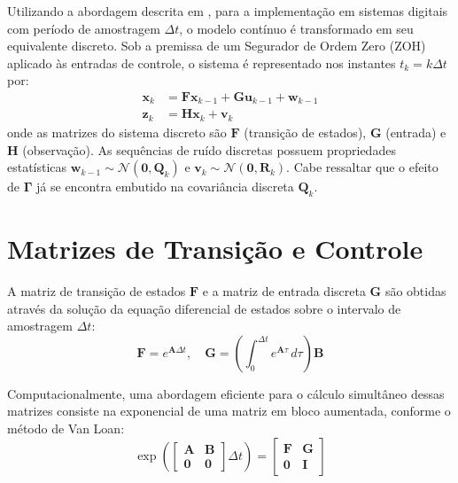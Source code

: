 \documentclass[journal]{IEEEtran}
\begin{document}
\begin{appendices}
Utilizando a abordagem descrita em \cite{chen2023kalman}, para a implementação em sistemas digitais com período de amostragem $\Delta t$, o modelo contínuo é transformado em seu equivalente discreto. Sob a premissa de um Segurador de Ordem Zero (ZOH) aplicado às entradas de controle, o sistema é representado nos instantes $t_k = k \Delta t$ por:
\begin{align}
\mathbf{x}_k &= \mathbf{F} \mathbf{x}_{k-1} + \mathbf{G} \mathbf{u}_{k-1} + \mathbf{w}_{k-1} \label{eq:ss_disc} \\
\mathbf{z}_k &= \mathbf{H} \mathbf{x}_k + \mathbf{v}_k
\end{align}
onde as matrizes do sistema discreto são $\mathbf{F}$ (transição de estados), $\mathbf{G}$ (entrada) e $\mathbf{H}$ (observação). As sequências de ruído discretas possuem propriedades estatísticas $\mathbf{w}_{k-1} \sim \mathcal{N}(\mathbf{0}, \mathbf{Q}_k)$ e $\mathbf{v}_k \sim \mathcal{N}(\mathbf{0}, \mathbf{R}_k)$. Cabe ressaltar que o efeito de $\mathbf{\Gamma}$ já se encontra embutido na covariância discreta $\mathbf{Q}_k$.

\section{Matrizes de Transição e Controle}

A matriz de transição de estados $\mathbf{F}$ e a matriz de entrada discreta $\mathbf{G}$ são obtidas através da solução da equação diferencial de estados sobre o intervalo de amostragem $\Delta t$:
\begin{equation}
\mathbf{F} = e^{\mathbf{A} \Delta t}, \quad \mathbf{G} = \left( \int_{0}^{\Delta t} e^{\mathbf{A} \tau} \, d\tau \right) \mathbf{B}
\end{equation}

Computacionalmente, uma abordagem eficiente para o cálculo simultâneo dessas matrizes consiste na exponencial de uma matriz em bloco aumentada, conforme o método de Van Loan:
\begin{equation}
\exp\left( \begin{bmatrix} \mathbf{A} & \mathbf{B} \\ \mathbf{0} & \mathbf{0} \end{bmatrix} \Delta t \right) = \begin{bmatrix} \mathbf{F} & \mathbf{G} \\ \mathbf{0} & \mathbf{I} \end{bmatrix}
\end{equation}


\end{appendices}
\end{document}
